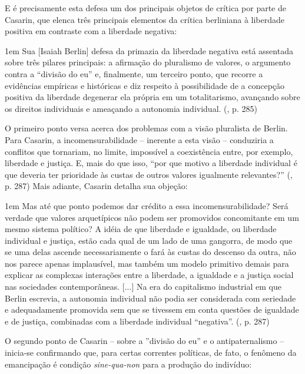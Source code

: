 \documentclass[12pt,a4paper]{article}
\newenvironment{citac}
{
	\begin{addmargin}
		[4cm]{1em} \footnotesize}{\normalfont 
	\end{addmargin}
}
\begin{document}
	E é precisamente esta defesa um dos principais objetos de crítica 
	por parte de Casarin, que elenca três principais elementos da 
	crítica berliniana à liberdade positiva em contraste com a liberdade 
	negativa: 

	\begin{citac}
		Sua [Isaiah Berlin] defesa da primazia da liberdade negativa
		está assentada sobre três pilares principais: a afirmação 
		do pluralismo de valores, o argumento contra a “divisão do 
		eu” e, finalmente, um terceiro ponto, que recorre a 
		evidências empíricas e históricas e diz respeito à 
		possibilidade de a concepção positiva da liberdade degenerar 
		ela própria em um totalitarismo, avançando sobre os direitos 
		individuais e ameaçando a autonomia individual. 
		(\cite{casarin}, p. 285)
	\end{citac}

	O primeiro ponto versa acerca dos problemas com a visão pluralista de 
	Berlin. Para Casarin, a incomensurabilidade -- inerente a esta visão --
	conduziria a conflitos que tornariam, no limite, impossível a 
	coexistência entre, por exemplo, liberdade e justiça. E, mais do que 
	isso, “por que motivo a liberdade individual é que deveria ter 
	prioridade às custas de outros valores igualmente relevantes?” 
	(\cite{casarin}, p. 287) Mais adiante, Casarin detalha sua objeção: 

	\begin{citac}
		Mas até que ponto podemos dar crédito a essa
		incomensurabilidade? Será verdade que valores
		arquetípicos não podem ser promovidos
		concomitante em um mesmo sistema político? A
		idéia de que liberdade e igualdade, ou liberdade
		individual e justiça, estão cada qual de um lado de
		uma gangorra, de modo que se uma delas ascende 
		necessariamente o fará às custas do descenso
		da outra, não nos parece apenas implausível, mas
		também um modelo primitivo demais para explicar 
		as complexas interações entre a liberdade, a 
		igualdade e a justiça social nas sociedades contemporâneas. 
		[...]
		Na era do capitalismo industrial em que Berlin escrevia, a
		autonomia individual não podia ser considerada 
		com seriedade e adequadamente promovida sem
		que se tivessem em conta questões de igualdade e
		de justiça, combinadas com a liberdade individual “negativa”.
		(\cite{casarin}, p. 287)
	\end{citac}
	
	O segundo ponto de Casarin -- sobre a ”divisão do eu” e o 
	antipaternalismo -- inicia-se confirmando que, para certas correntes 
	políticas, de fato, o fenômeno da emancipação é condição 
	\textit{sine-qua-non} para a produção do indivíduo: 
\end{document}
